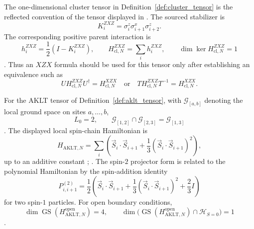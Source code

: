 \begin{remark}\label{rem:cluster_stabilizer_convention}
    The one-dimensional cluster tensor in Definition~\ref{def:cluster_tensor}
    is the reflected convention of the tensor displayed in
    \cite[lines~2364--2369]{Cirac2021Matrix}.  The sourced stabilizer is
    \[
        K_i^{ZXZ}
        =
        \sigma^z_i\sigma^x_{i+1}\sigma^z_{i+2}.
    \]
    The corresponding positive parent interaction is
    \[
        h_i^{ZXZ}
        =
        \frac12(I-K_i^{ZXZ}),
        \qquad
        H_{\mathrm{cl},N}^{ZXZ}
        =
        \sum_i h_i^{ZXZ},
        \qquad
        \dim \ker H_{\mathrm{cl},N}^{ZXZ}=1
    \]
    \cite[local TeX lines~374--387]{PerezGarcia2007Matrix}.  Thus an $XZX$ formula
    should be used for this tensor only after establishing an equivalence such as
    \[
        U H_{\mathrm{cl},N}^{ZXZ} U^\dagger
        =
        H_{\mathrm{cl},N}^{XZX}
        \quad\text{or}\quad
        T H_{\mathrm{cl},N}^{ZXZ} T^{-1}
        =
        H_{\mathrm{cl},N}^{XZX}.
    \]
\end{remark}

\begin{remark}\label{rem:aklt_parent_hamiltonian}
    For the AKLT tensor of Definition~\ref{def:aklt_tensor}, with
    $\mathcal G_{[a,b]}$ denoting the local ground space on sites
    $a,\ldots,b$,
    \[
        L_0=2,
        \qquad
        \mathcal G_{[1,2]}\cap \mathcal G_{[2,3]}=\mathcal G_{[1,3]}
    \]
    \cite[line~2095]{Cirac2021Matrix}.  The displayed local spin-chain
    Hamiltonian is
    \[
        H_{\mathrm{AKLT},N}
        =
        \sum_i
        \left(
            \vec S_i\cdot\vec S_{i+1}
            +\frac13(\vec S_i\cdot\vec S_{i+1})^2
        \right),
    \]
    up to an additive constant
    \cite[local TeX lines~340--349]{PerezGarcia2007Matrix};
    \cite[lines~2126--2130]{Schuch2011Phases}.  The spin-$2$ projector form
    is related to the polynomial Hamiltonian by the spin-addition identity
    \[
        P^{(2)}_{i,i+1}
        =
        \frac12
        \left(
            \vec S_i\cdot\vec S_{i+1}
            +\frac13(\vec S_i\cdot\vec S_{i+1})^2
            +\frac23 I
        \right)
    \]
    for two spin-$1$ particles.  For open boundary conditions,
    \[
        \dim \operatorname{GS}(H_{\mathrm{AKLT},N}^{\mathrm{open}})=4,
        \qquad
        \dim\bigl(\operatorname{GS}(H_{\mathrm{AKLT},N}^{\mathrm{open}})
            \cap \mathcal H_{S=0}\bigr)=1
    \]
    \cite[lines~1169--1174]{Cirac2021Matrix}.
\end{remark}
